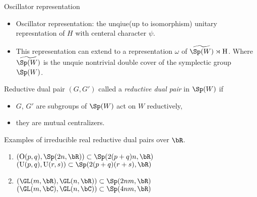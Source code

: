 \documentclass[final,hyperref={pdfpagelabels=false}]{beamer} %
\begin{document}
\begin{frame}
\begin{columns}
\begin{column}{.49\textwidth}
\begin{block}{Oscillator representation}
\begin{itemize}
        \item Oscillator representation: the unqiue(up to isomorphism) unitary represntation of $H$ with centeral character $\psi$.
        \item This representation can extend to a representation $\omega$ of 
          $\widetilde{\Sp(W)}\rtimes \mathrm{H}$. Where 
          $\widetilde{\Sp(W)}$ is the unquie nontrivial double cover of the symplectic group $\Sp(W)$.
        \end{itemize}
      \end{block}
      \vfill
      \begin{block}{Reductive dual pair}
        $(G,G')$ called a {\em reductive dual pair} in $\Sp(W)$ if
        \begin{itemize}
        \item $G$, $G'$  are subgroups of $\Sp(W)$ act on $W$ reductively,
        \item they are mutual centralizers.
        \end{itemize}
        Examples of irreducible real reductive dual pairs over $\bR$.
        \begin{enumerate}[Type I]
        \item 
           $(\mathrm{O}(p,q), \Sp(2n,\bR))\subset \Sp(2(p+q)n,\bR)$\\
           $(\mathrm{U}(p,q), \mathrm{U}(r,s))\subset \Sp(2(p+q)(r+s),\bR)$
        \item  $(\GL(m,\bR),\GL(n,\bR))\subset \Sp(2nm,\bR)$\\
          $(\GL(m,\bC),\GL(n,\bC))\subset \Sp(4nm,\bR)$
        \end{enumerate}
      \end{block}


\end{column}
\end{columns}
\end{frame}
\end{document}
